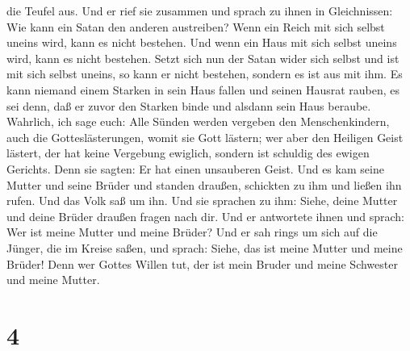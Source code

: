 die Teufel aus.  Und er rief sie zusammen und sprach zu
ihnen in Gleichnissen: Wie kann ein Satan den anderen austreiben?
 Wenn ein Reich mit sich selbst uneins wird, kann es nicht
bestehen.  Und wenn ein Haus mit sich selbst uneins wird,
kann es nicht bestehen.  Setzt sich nun der Satan wider
sich selbst und ist mit sich selbst uneins, so kann er nicht bestehen,
sondern es ist aus mit ihm.  Es kann niemand einem Starken
in sein Haus fallen und seinen Hausrat rauben, es sei denn, daß er zuvor
den Starken binde und alsdann sein Haus beraube.  Wahrlich,
ich sage euch: Alle Sünden werden vergeben den Menschenkindern, auch die
Gotteslästerungen, womit sie Gott lästern;  wer aber den
Heiligen Geist lästert, der hat keine Vergebung ewiglich, sondern ist
schuldig des ewigen Gerichts.  Denn sie sagten: Er hat
einen unsauberen Geist.  Und es kam seine Mutter und seine
Brüder und standen draußen, schickten zu ihm und ließen ihn rufen.
 Und das Volk saß um ihn. Und sie sprachen zu ihm: Siehe,
deine Mutter und deine Brüder draußen fragen nach dir.  Und
er antwortete ihnen und sprach: Wer ist meine Mutter und meine Brüder?
 Und er sah rings um sich auf die Jünger, die im Kreise
saßen, und sprach: Siehe, das ist meine Mutter und meine Brüder!
 Denn wer Gottes Willen tut, der ist mein Bruder und meine
Schwester und meine Mutter.

\hypertarget{section-3}{%
\section{4}\label{section-3}}

